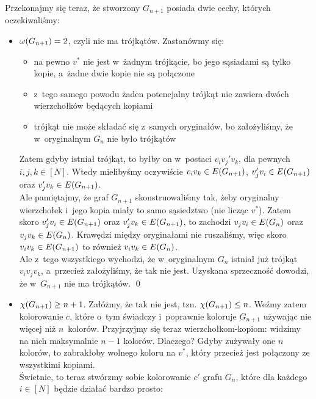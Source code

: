 Przekonajmy się teraz, że stworzony \(G_{n + 1}\) posiada dwie cechy, których oczekiwaliśmy:
\begin{itemize}
	\item \(\omega\pars{G_{n + 1}} = 2\), czyli nie ma trójkątów. Zastanówmy się:
	      \begin{itemize}
		      \item na pewno \(v^\ast\) nie jest w~żadnym trójkącie, bo jego sąsiadami są tylko kopie, a~żadne dwie kopie nie są połączone
		      \item z~tego samego powodu żaden potencjalny trójkąt nie zawiera dwóch wierzchołków będących kopiami
		      \item trójkąt nie może składać się z~samych oryginałów, bo założyliśmy, że w~oryginalnym \(G_n\) nie było trójkątów
	      \end{itemize}
	      Zatem gdyby istniał trójkąt, to byłby on w~postaci \(v_iv_j'v_k\), dla pewnych \(i, j, k \in [N]\). Wtedy mielibyśmy oczywiście \(v_iv_k \in E\pars{G_{n + 1}}\), \(v_j'v_i \in E\pars{G_{n + 1}}\) oraz \(v_j'v_k \in E\pars{G_{n + 1}}\).\\
	      Ale pamiętajmy, że graf \(G_{n + 1}\) skonstruowaliśmy tak, żeby oryginalny wierzchołek i~jego kopia miały to samo sąsiedztwo (nie licząc \(v^\ast\)). Zatem skoro \(v_j'v_i \in E\pars{G_{n + 1}}\) oraz \(v_j'v_k \in E\pars{G_{n + 1}}\), to zachodzi \(v_jv_i \in E\pars{G_n}\) oraz \(v_jv_k \in E\pars{G_n}\). Krawędzi między oryginałami nie ruszaliśmy, więc skoro \(v_iv_k \in E\pars{G_{n + 1}}\) to również \(v_iv_k \in E\pars{G_n}\).\\
	      Ale z~tego wszystkiego wychodzi, że w~oryginalnym \(G_n\) istniał już trójkąt \(v_iv_jv_k\), a~przecież założyliśmy, że tak nie jest. Uzyskana sprzeczność dowodzi, że w~\(G_{n + 1}\) nie ma trójkątów.
	      \qed
	\item \(\chi\pars{G_{n + 1}} \geq n + 1\).
	      Załóżmy, że tak nie jest, tzn. \(\chi\pars{G_{n + 1}} \leq n\). Weźmy zatem kolorowanie \(c\), które o~tym świadczy i~poprawnie koloruje \(G_{n + 1}\) używając nie więcej niż \(n\)~kolorów. Przyjrzyjmy się teraz wierzchołkom-kopiom: widzimy na nich maksymalnie \(n - 1\) kolorów. Dlaczego? Gdyby zużywały one \(n\) kolorów, to zabrakłoby wolnego koloru na \(v^\ast\), który przecież jest połączony ze wszystkimi kopiami.\\
	      Świetnie, to teraz stwórzmy sobie kolorowanie \(c'\) grafu \(G_n\), które dla każdego \(i \in [N]\) będzie działać bardzo prosto:
	      \begin{equation*}

\end{equation*}
\end{itemize}
